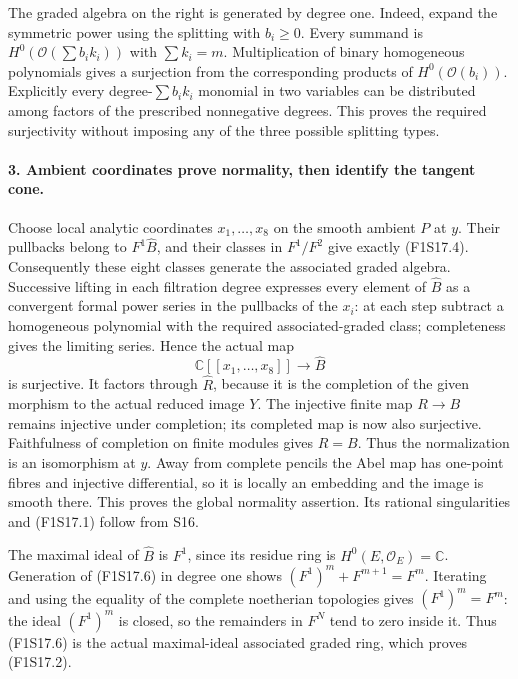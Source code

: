 The graded algebra on the right is generated by degree one. Indeed,
expand the symmetric power using the splitting with $b_i\geq0$.
Every summand is $H^0(\mathcal O(\sum b_i k_i))$ with
$\sum k_i=m$. Multiplication of binary homogeneous polynomials gives
a surjection from the corresponding products of
$H^0(\mathcal O(b_i))$. Explicitly every degree-$\sum b_i k_i$
monomial in two variables can be distributed among factors of the
prescribed nonnegative degrees. This proves the required surjectivity
without imposing any of the three possible splitting types.

\paragraph{3. Ambient coordinates prove normality, then identify the tangent cone.}
Choose local analytic coordinates $x_1,\ldots,x_8$ on the smooth
ambient $P$ at $y$. Their pullbacks belong to $F^1\widehat B$, and
their classes in $F^1/F^2$ give exactly (F1S17.4). Consequently these
eight classes generate the associated graded algebra. Successive
lifting in each filtration degree expresses every element of
$\widehat B$ as a convergent formal power series in the pullbacks of
the $x_i$: at each step subtract a homogeneous polynomial with the
required associated-graded class; completeness gives the limiting
series. Hence the actual map
\[
                  \mathbb C[[x_1,\ldots,x_8]]
                               \longrightarrow\widehat B
\]
is surjective. It factors through $\widehat R$, because it is the
completion of the given morphism to the actual reduced image $Y$.
The injective finite map $R\to B$ remains injective under completion;
its completed map is now also surjective. Faithfulness of completion
on finite modules gives $R=B$. Thus the normalization is an isomorphism
at $y$. Away from complete pencils the Abel map has one-point fibres
and injective differential, so it is locally an embedding and the
image is smooth there. This proves the global normality assertion.
Its rational singularities and (F1S17.1) follow from S16.

The maximal ideal of $\widehat B$ is $F^1$, since its residue ring is
$H^0(E,\mathcal O_E)=\mathbb C$. Generation of (F1S17.6) in degree one
shows $(F^1)^m+F^{m+1}=F^m$. Iterating and using the equality of the
complete noetherian topologies gives $(F^1)^m=F^m$: the ideal
$(F^1)^m$ is closed, so the remainders in $F^N$ tend to zero inside it.
Thus (F1S17.6) is the actual maximal-ideal associated graded ring, which
proves (F1S17.2).

